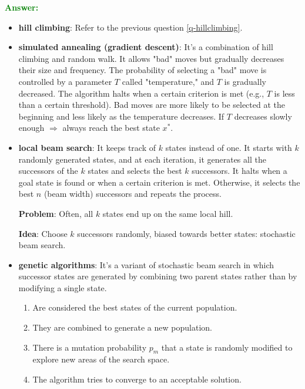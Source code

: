 \documentclass[12pt]{article}
\begin{document}
\begin{enumerate}[label=\textbf{II.\arabic*}]
          \textcolor{green}{\textbf{Answer:}}
          \begin{itemize}
              \item \textbf{hill climbing}: Refer to the previous question \ref{q-hillclimbing}.
              \item \textbf{simulated annealing (gradient descent)}: It's a combination of hill climbing and random walk.
                    It allows "bad" moves but gradually decreases their size and frequency.
                    The probability of selecting a "bad" move is controlled by a parameter $T$ called "temperature," and $T$ is gradually decreased.
                    The algorithm halts when a certain criterion is met (e.g., $T$ is less than a certain threshold).
                    Bad moves are more likely to be selected at the beginning and less likely as the temperature decreases.
                    If $T$ decreases slowly enough $\Rightarrow$ always reach the best state $x^*$.
              \item \textbf{local beam search}: It keeps track of $k$ states instead of one.
                    It starts with $k$ randomly generated states, and at each iteration, it generates all the successors of the $k$ states and selects the best $k$ successors.
                    It halts when a goal state is found or when a certain criterion is met.
                    Otherwise, it selects the best $n$ (beam width) successors and repeats the process.

                    \textbf{Problem}: Often, all $k$ states end up on the same local hill.

                    \textbf{Idea}: Choose $k$ successors randomly, biased towards better states: stochastic beam search.

              \item \textbf{genetic algorithms}: It's a variant of stochastic beam search in which successor states are generated by combining two parent states rather than by modifying a single state.
                    \begin{enumerate}
                        \item Are considered the best states of the current population.
                        \item They are combined to generate a new population.
                        \item There is a mutation probability $p_m$ that a state is randomly modified to explore new areas of the search space.
                        \item The algorithm tries to converge to an acceptable solution.
                    \end{enumerate}
          \end{itemize}
\end{enumerate}
\end{document}
